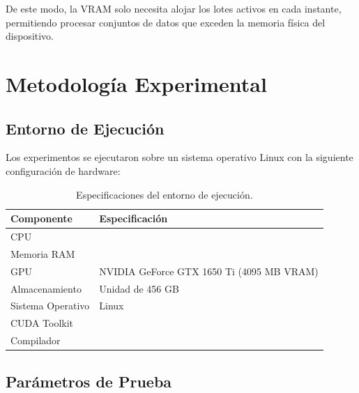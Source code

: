 \documentclass[12pt, a4paper]{article}
\begin{document}
De este modo, la VRAM solo necesita alojar los lotes activos en cada instante,
permitiendo procesar conjuntos de datos que exceden la memoria física del
dispositivo.

\section{Metodología Experimental}

\subsection{Entorno de Ejecución}

Los experimentos se ejecutaron sobre un sistema operativo Linux con la
siguiente configuración de hardware:

\begin{table}[H]
    \centering
    \caption{Especificaciones del entorno de ejecución.}
    \label{tab:entorno}
    \begin{tabular}{ll}
        \toprule
        \textbf{Componente} & \textbf{Especificación} \\
        \midrule
        CPU          & %
                       \\
        Memoria RAM  & %
                       \\
        GPU          & NVIDIA GeForce GTX 1650 Ti (4095 MB VRAM) \\
        Almacenamiento & Unidad de 456 GB \\
        Sistema Operativo & Linux %
                            \\
        CUDA Toolkit & %
                       \\
        Compilador   & %
                       \\
        \bottomrule
    \end{tabular}
\end{table}

\subsection{Parámetros de Prueba}
\end{document}
